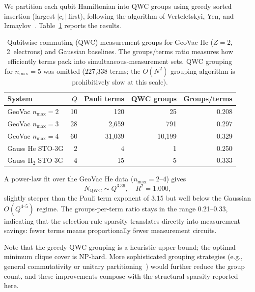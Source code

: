 \documentclass[aps,pra,twocolumn,superscriptaddress,longbibliography]{revtex4-2}
\begin{document}
We partition each qubit Hamiltonian into QWC groups using greedy
sorted insertion (largest $|c_i|$ first), following the algorithm of
Verteletskyi, Yen, and Izmaylov~\cite{verteletskyi2020}.
Table~\ref{tab:qwc} reports the results.

\begin{table}[t]
\caption{Qubitwise-commuting (QWC) measurement groups for GeoVac He
($Z = 2$, 2~electrons) and Gaussian baselines.  The groups/terms ratio
measures how efficiently terms pack into simultaneous-measurement sets.
QWC grouping for $n_{\max} = 5$ was omitted (227{,}338 terms; the
$O(N^2)$ grouping algorithm is prohibitively slow at this scale).}
\label{tab:qwc}
\begin{ruledtabular}
\begin{tabular}{lrrrr}
System & $Q$ & Pauli terms & QWC groups & Groups/terms \\
\hline
GeoVac $n_{\max}{=}2$ &  10 &         120 &      25 & 0.208 \\
GeoVac $n_{\max}{=}3$ &  28 &       2{,}659 &     791 & 0.297 \\
GeoVac $n_{\max}{=}4$ &  60 &      31{,}039 &  10{,}199 & 0.329 \\
\hline
Gauss He STO-3G   &   2 &           4 &       1 & 0.250 \\
Gauss H$_2$ STO-3G &  4 &          15 &       5 & 0.333 \\
\end{tabular}
\end{ruledtabular}
\end{table}

A power-law fit over the GeoVac He data ($n_{\max} = 2$--$4$) gives
\begin{equation}
  N_{\mathrm{QWC}} \sim Q^{3.36}, \quad R^2 = 1.000,
  \label{eq:qwc_scaling}
\end{equation}
slightly steeper than the Pauli term exponent of 3.15 but well below
the Gaussian $O(Q^{4\text{--}5})$ regime.  The groups-per-term ratio
stays in the range 0.21--0.33, indicating that the selection-rule
sparsity translates directly into measurement savings: fewer terms
means proportionally fewer measurement circuits.

Note that the greedy QWC grouping is a heuristic upper bound; the
optimal minimum clique cover is NP-hard.  More sophisticated grouping
strategies (e.g., general commutativity or unitary
partitioning~\cite{yen2020}) would further reduce the group count, and
these improvements compose with the structural sparsity reported here.
\end{document}
